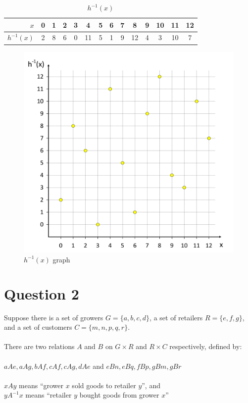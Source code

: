 \documentclass[12pt,a4paper]{article}
\begin{document}
\begin{table}[!h]
\centering
\caption{$h^{-1}(x)$}
\begin{tabular}{r|c|c|c|c|c|c|c|c|c|c|c|c|c}
$x$ & 0 & 1 & 2 & 3 & 4 & 5 & 6 & 7 & 8 & 9 & 10 & 11 & 12 \\
\hline
$h^{-1}(x)$ & 2 & 8 & 6 & 0 & 11 & 5 & 1 & 9 & 12 & 4 & 3 & 10 & 7
\end{tabular}
\end{table}

\begin{figure}[h]
\centering
\caption{$h^{-1}(x)$ graph}
\includegraphics[scale=0.35]{./img/graph_q1-4.pdf}
\end{figure}

\section{Question 2}

Suppose there is a set of growers $G = \{a, b, c, d\}$, a set of retailers $R = \{e, f, g\}$, and a set of customers $C = \{m, n, p, q, r\}$. \\
\\
There are two relations $A$ and $B$ on $G \times R$ and $R \times C$ respectively, defined by: \\
\\
$aAe, aAg, bAf, cAf, cAg, dAe$ and $eBn, eBq, fBp, gBm, gBr$ \\
\\
$xAy$ means ``grower $x$ sold goods to retailer $y$'', and \\ \noindent
$yA^{-1}x$ means ``retailer $y$ bought goods from grower $x$''
\end{document}
